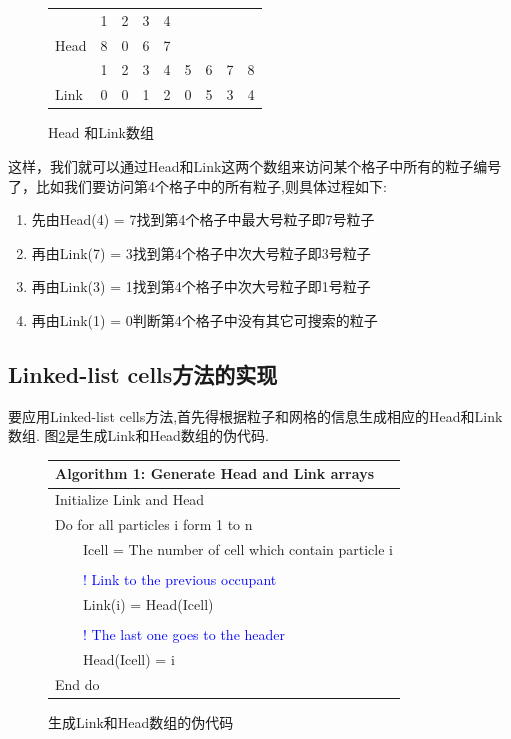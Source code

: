 \documentclass[a4paper]{article}
\begin{document}
\begin{figure}[!htb]
\centering
\begin{tabular}{lllllllll}
 & 1 & 2 & 3 & 4 &  &  &  &  \\
\cline{2-5}
\multicolumn{1}{l|}{Head} & \multicolumn{1}{l|}{8} & \multicolumn{1}{l|}{0} & \multicolumn{1}{l|}{6} & \multicolumn{1}{l|}{7} &  &  &  &  \\
\cline{2-5}
 & 1 & 2 & 3 & 4 & 5 & 6 & 7 & 8 \\
\cline{2-9}
\multicolumn{1}{l|}{Link} & \multicolumn{1}{l|}{0} & \multicolumn{1}{l|}{0} & \multicolumn{1}{l|}{1} & \multicolumn{1}{l|}{2} & \multicolumn{1}{l|}{0} & \multicolumn{1}{l|}{5} & \multicolumn{1}{l|}{3} & \multicolumn{1}{l|}{4} \\
\cline{2-9}
\end{tabular}
\caption{\label{HeadLink}Head 和Link数组}
\end{figure}

这样，我们就可以通过Head和Link这两个数组来访问某个格子中所有的粒子编号了，比如我们要访问第4个格子中的所有粒子,则具体过程如下:

\begin{enumerate}
\item 先由Head(4) = 7找到第4个格子中最大号粒子即7号粒子
\item 再由Link(7)  = 3找到第4个格子中次大号粒子即3号粒子
\item 再由Link(3)  = 1找到第4个格子中次大号粒子即1号粒子
\item 再由Link(1)  = 0判断第4个格子中没有其它可搜索的粒子
\end{enumerate}

\subsection{Linked-list cells方法的实现}

要应用Linked-list cells方法,首先得根据粒子和网格的信息生成相应的Head和Link数组. 图\ref{Alg1}是生成Link和Head数组的伪代码.

\begin{figure}[!htb]
\centering
\begin{tabular}{|lll|}
\hline
\multicolumn{3}{|l|}{Algorithm 1:  Generate Head and Link arrays} \\
\hline
\multicolumn{3}{|l|}{Initialize Link and Head} \\
\multicolumn{3}{|l|}{Do for all particles i form 1 to n} \\
 &       & Icell = The number of cell which contain  particle i \\
  &       & \\
 &  & \textcolor{blue}{! Link to the previous occupant } \\
 &  &  Link(i) = Head(Icell) \\
   &       & \\
 &  & \textcolor{blue}{! The last one goes to the header } \\
 &  & Head(Icell) = i \\
\multicolumn{3}{|l|}{End do} \\
\hline
\end{tabular}
\caption{\label{Alg1}生成Link和Head数组的伪代码}
\end{figure}
\end{document}
